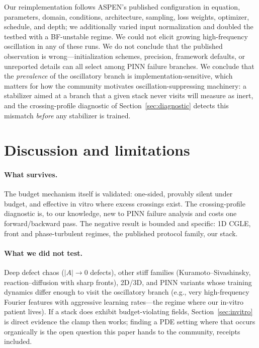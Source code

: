 \documentclass[10pt]{article}
\begin{document}
Our reimplementation follows ASPEN's published configuration in equation,
parameters, domain, conditions, architecture, sampling, loss weights, optimizer,
schedule, and depth; we additionally varied input normalization and doubled the
testbed with a BF-unstable regime. We could not elicit growing high-frequency
oscillation in any of these runs. We do not conclude that the published observation
is wrong---initialization schemes, precision, framework defaults, or unreported
details can all select among PINN failure branches. We conclude that the
\emph{prevalence} of the oscillatory branch is implementation-sensitive, which
matters for how the community motivates oscillation-suppressing machinery: a
stabilizer aimed at a branch that a given stack never visits will measure as inert,
and the crossing-profile diagnostic of Section~\ref{sec:diagnostic} detects this
mismatch \emph{before} any stabilizer is trained.

\section{Discussion and limitations}
\label{sec:discussion}

\paragraph{What survives.} The budget mechanism itself is validated: one-sided,
provably silent under budget, and effective in vitro where excess crossings exist.
The crossing-profile diagnostic is, to our knowledge, new to PINN failure analysis
and costs one forward/backward pass. The negative result is bounded and specific:
1D CGLE, front and phase-turbulent regimes, the published protocol family, our
stack.

\paragraph{What we did not test.} Deep defect chaos ($|A|\!\to\!0$ defects), other
stiff families (Kuramoto--Sivashinsky, reaction--diffusion with sharp fronts),
2D/3D, and PINN variants whose training dynamics differ enough to visit the
oscillatory branch (e.g., very high-frequency Fourier features with aggressive
learning rates---the regime where our in-vitro patient lives). If a stack does
exhibit budget-violating fields, Section~\ref{sec:invitro} is direct evidence the
clamp then works; finding a PDE setting where that occurs organically is the open
question this paper hands to the community, receipts included.
\end{document}
